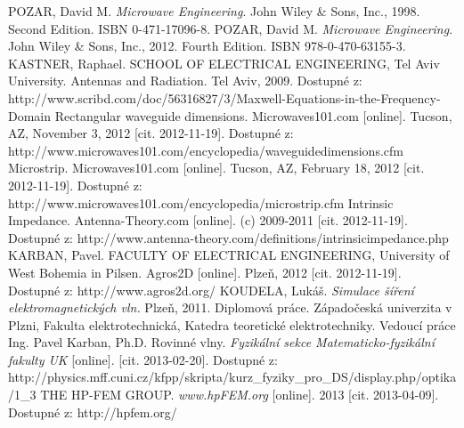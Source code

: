 \documentclass[12pt,a4paper,oneside]{article}
\numberwithin{equation}{section} %
\numberwithin{figure}{section} %
\numberwithin{table}{section} %
\begin{document}
\newpage
{} %
\begin{thebibliography}{10}

 POZAR, David M. \textit{Microwave Engineering}. John Wiley \& Sons, Inc., 1998. Second Edition. ISBN 0-471-17096-8.
 POZAR, David M. \textit{Microwave Engineering}. John Wiley \& Sons, Inc., 2012. Fourth Edition. ISBN 978-0-470-63155-3.
 KASTNER, Raphael. SCHOOL OF ELECTRICAL ENGINEERING, Tel Aviv University. Antennas and Radiation. Tel Aviv, 2009. Dostupné z: http://www.scribd.com/doc/56316827/3/Maxwell-Equations-in-the-Frequency-Domain
 Rectangular waveguide dimensions. Microwaves101.com [online]. Tucson, AZ, November 3, 2012 [cit. 2012-11-19]. Dostupné z: http://www.microwaves101.com/encyclopedia/waveguidedimensions.cfm
 Microstrip. Microwaves101.com [online]. Tucson, AZ, February 18, 2012 [cit. 2012-11-19]. Dostupné z: http://www.microwaves101.com/encyclopedia/microstrip.cfm
 Intrinsic Impedance. Antenna-Theory.com [online]. (c) 2009-2011 [cit. 2012-11-19]. Dostupné z: http://www.antenna-theory.com/definitions/intrinsicimpedance.php
 KARBAN, Pavel. FACULTY OF ELECTRICAL ENGINEERING, University of West Bohemia in Pilsen. Agros2D [online]. Plzeň, 2012 [cit. 2012-11-19]. Dostupné z: http://www.agros2d.org/
 KOUDELA, Lukáš. \textit{Simulace šíření elektromagnetických vln.} Plzeň, 2011. Diplomová práce. Západočeská univerzita v Plzni, Fakulta elektrotechnická, Katedra teoretické elektrotechniky. Vedoucí práce Ing. Pavel Karban, Ph.D.
 Rovinné vlny. \textit{Fyzikální sekce Matematicko-fyzikální fakulty UK} [online]. [cit. 2013-02-20]. Dostupné z: http://physics.mff.cuni.cz/kfpp/skripta/kurz\_fyziky\_pro\_DS/display.php/optika/1\_3
 THE HP-FEM GROUP. \textit{www.hpFEM.org} [online]. 2013 [cit. 2013-04-09]. Dostupné z: http://hpfem.org/


\end{thebibliography}

\newpage
{} %
\setlength{\parskip}{0ex}%
\listoffigures
\end{document}
